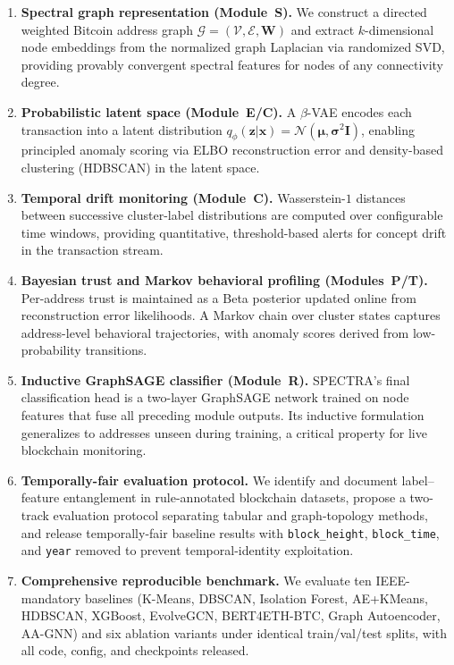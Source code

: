 \begin{enumerate}[leftmargin=*, label=\textbf{C\arabic*}]

  \item \textbf{Spectral graph representation (Module~S).}
    We construct a directed weighted Bitcoin address graph
    $\mathcal{G} = (\mathcal{V}, \mathcal{E}, \mathbf{W})$ and extract
    $k$-dimensional node embeddings from the normalized graph Laplacian
    via randomized SVD, providing provably convergent spectral features
    for nodes of any connectivity degree.

  \item \textbf{Probabilistic latent space (Module~E/C).}
    A $\beta$-VAE encodes each transaction into a latent distribution
    $q_\phi(\mathbf{z}|\mathbf{x}) = \mathcal{N}(\boldsymbol{\mu}, \boldsymbol{\sigma}^2\mathbf{I})$,
    enabling principled anomaly scoring via ELBO reconstruction error
    and density-based clustering (HDBSCAN) in the latent space.

  \item \textbf{Temporal drift monitoring (Module~C).}
    Wasserstein-$1$ distances between successive cluster-label distributions
    are computed over configurable time windows, providing quantitative,
    threshold-based alerts for concept drift in the transaction stream.

  \item \textbf{Bayesian trust and Markov behavioral profiling (Modules~P/T).}
    Per-address trust is maintained as a Beta posterior updated online
    from reconstruction error likelihoods.
    A Markov chain over cluster states captures address-level behavioral
    trajectories, with anomaly scores derived from low-probability transitions.

  \item \textbf{Inductive GraphSAGE classifier (Module~R).}
    SPECTRA's final classification head is a two-layer GraphSAGE network
    trained on node features that fuse all preceding module outputs.
    Its inductive formulation generalizes to addresses unseen during training,
    a critical property for live blockchain monitoring.

  \item \textbf{Temporally-fair evaluation protocol.}
    We identify and document label--feature entanglement in rule-annotated
    blockchain datasets, propose a two-track evaluation protocol separating
    tabular and graph-topology methods, and release temporally-fair baseline
    results with \texttt{block\_height}, \texttt{block\_time}, and
    \texttt{year} removed to prevent temporal-identity exploitation.

  \item \textbf{Comprehensive reproducible benchmark.}
    We evaluate ten IEEE-mandatory baselines (K-Means, DBSCAN, Isolation
    Forest, AE+KMeans, HDBSCAN, XGBoost, EvolveGCN, BERT4ETH-BTC, Graph
    Autoencoder, AA-GNN) and six ablation variants under identical
    train/val/test splits, with all code, config, and checkpoints released.

\end{enumerate}

